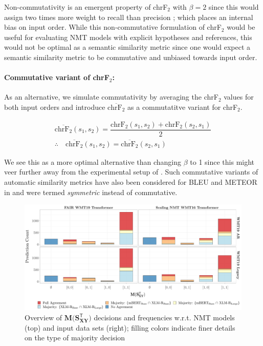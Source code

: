 \documentclass[11pt,a4paper]{article}
\begin{document}
Non-commutativity is an emergent property of chrF$_2$ with $\beta = 2$ since this would assign two times more weight to recall than precision \cite{popovic2015chrf}; which places an internal bias on input order. While this non-commutative formulation of chrF$_2$ would be useful for evaluating NMT models with explicit hypotheses and references, this would not be optimal as a semantic similarity metric since one would expect a semantic similarity metric to be commutative and unbiased towards input order.

\paragraph{Commutative variant of chrF$_2$:} As an alternative, we simulate commutativity by averaging the chrF$_2$ values for both input orders and introduce $\overline{\text{chrF}_2}$ as a commutatitve variant for chrF$_2$.

\begin{gather}
  \overline{\text{chrF}_2}(s_1,s_2) = \dfrac{\text{chrF}_2(s_1,s_2) + \text{chrF}_2(s_2,s_1)}{2} \\[5pt]
  \therefore \quad \overline{\text{chrF}_2}(s_1,s_2) = \overline{\text{chrF}_2}(s_2,s_1)
\end{gather}

We see this as a more optimal alternative than changing $\beta$ to 1 since this might veer further away from the experimental setup of \citet{michel2019evaluation}. Such commutative variants of automatic similarity metrics have also been considered for BLEU and METEOR in \citet{wieting-etal-2019-beyond} and were termed \textit{symmetric} instead of commutative.

\begin{figure}
  \centering 
  \includegraphics[trim={0cm 0cm 0cm 0cm},clip,width=\textwidth]{paraphrase_detection_joint_decision.pdf}
  \caption{Overview of $\mathbf{M(S_{XY}^{\mathsf{T}}})$ decisions and frequencies w.r.t. NMT models (top) and input data sets (right); filling colors indicate finer details on the type of majority decision}
  \label{paraphrase_detection_joint_decision}
\end{figure}
\end{document}
